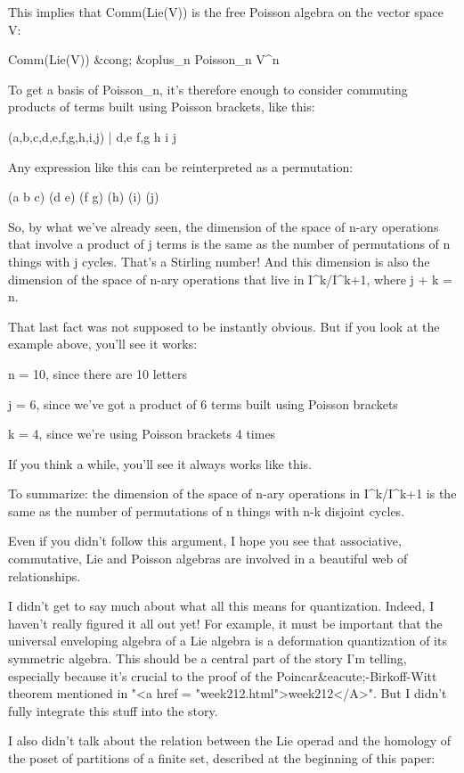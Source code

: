 This implies that Comm(Lie(V)) is the free Poisson algebra on
the vector space V:

Comm(Lie(V)) &cong; &oplus_{n} Poisson_{n} \otimes 
V^{\otimes n}

To get a basis of Poisson_{n}, it's therefore enough to consider
commuting products of terms built using Poisson brackets, like this:

(a,b,c,d,e,f,g,h,i,j) | {d,e} {f,g} h i j

Any expression like this can be reinterpreted as a permutation:

(a b c) (d e) (f g) (h) (i) (j)

So, by what we've already seen, the dimension of the space of n-ary
operations that involve a product of j terms is the same as the number
of permutations of n things with j cycles.  That's a Stirling number!
And this dimension is also the dimension of the space of n-ary
operations that live in I^{k}/I^{k+1}, where j + k = n.  

That last fact was not supposed to be instantly obvious.  But if you
look at the example above, you'll see it works:

n = 10, since there are 10 letters

j = 6, since we've got a product of 6 terms built using Poisson
brackets

k = 4, since we're using Poisson brackets 4 times

If you think a while, you'll see it always works like this.

To summarize: the dimension of the space of n-ary operations in
I^{k}/I^{k+1} is the same as the number of permutations of n
things with n-k disjoint cycles.  

Even if you didn't follow this argument, I hope you see that
associative, commutative, Lie and Poisson algebras are involved in a
beautiful web of relationships.  

I didn't get to say much about what all this means for quantization.
Indeed, I haven't really figured it all out yet!  For example, it must
be important that the universal enveloping algebra of a Lie algebra is
a deformation quantization of its symmetric algebra.  This should be a
central part of the story I'm telling, especially because it's crucial
to the proof of the Poincar&eacute;-Birkoff-Witt theorem mentioned in
"<a href = "week212.html">week212</A>".  But I didn't fully
integrate this stuff into the story.

I also didn't talk about the relation between the Lie operad and
the homology of the poset of partitions of a finite set, described
at the beginning of this paper:

